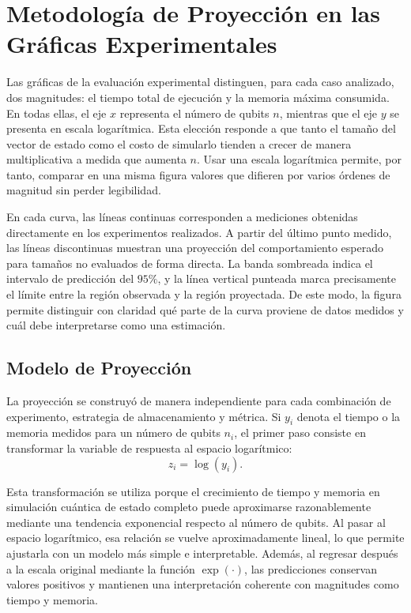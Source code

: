 \section{Metodología de Proyección en las Gráficas Experimentales}
\label{ap:proyeccion_graficas}

Las gráficas de la evaluación experimental distinguen, para cada caso analizado, dos
magnitudes: el tiempo total de ejecución y la memoria máxima consumida. En todas ellas, el
eje \(x\) representa el número de qubits \(n\), mientras que el eje \(y\) se presenta en escala
logarítmica. Esta elección responde a que tanto el tamaño del vector de estado como el costo
de simularlo tienden a crecer de manera multiplicativa a medida que aumenta \(n\). Usar una
escala logarítmica permite, por tanto, comparar en una misma figura valores que difieren por
varios órdenes de magnitud sin perder legibilidad.

En cada curva, las líneas continuas corresponden a mediciones obtenidas directamente en los
experimentos realizados. A partir del último punto medido, las líneas discontinuas muestran
una proyección del comportamiento esperado para tamaños no evaluados de forma directa. La
banda sombreada indica el intervalo de predicción del \(95\%\), y la línea vertical punteada
marca precisamente el límite entre la región observada y la región proyectada. De este modo,
la figura permite distinguir con claridad qué parte de la curva proviene de datos medidos y
cuál debe interpretarse como una estimación.

\subsection*{Modelo de Proyección}

La proyección se construyó de manera independiente para cada combinación de experimento,
estrategia de almacenamiento y métrica. Si \(y_i\) denota el tiempo o la memoria medidos
para un número de qubits \(n_i\), el primer paso consiste en transformar la variable de
respuesta al espacio logarítmico:
\[
z_i = \log(y_i).
\]

Esta transformación se utiliza porque el crecimiento de tiempo y memoria en simulación
cuántica de estado completo puede aproximarse razonablemente mediante una tendencia
exponencial respecto al número de qubits. Al pasar al espacio logarítmico, esa relación se
vuelve aproximadamente lineal, lo que permite ajustarla con un modelo más simple e
interpretable. Además, al regresar después a la escala original mediante la función
\(\exp(\cdot)\), las predicciones conservan valores positivos y mantienen una interpretación
coherente con magnitudes como tiempo y memoria.

